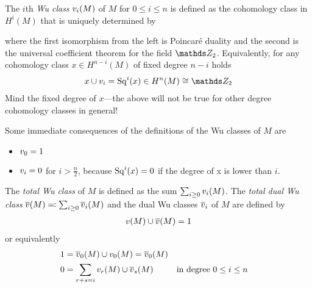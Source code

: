 \begin{Def}\label{def:wuclasses}
  The $i$th \emph{Wu class} $v_i(M)$ of $M$ for $0\leq i\leq n$ is defined
  as the cohomology class in $H^i(M)$ that is uniquely determined by
  \begin{center}
  \end{center}
  where the first isomorphism from the left is Poincaré duality %
  and the second is the universal coefficient theorem %
  for the field $\Zmod2$.
  Equivalently, for any cohomology class $x\in H^{n-i}(M)$ of fixed
  degree $n-i$ holds
  \begin{gather*}
    x\cup \v_i = \Sq i(x) \in H^n(M) \cong \Zmod2
  \end{gather*}
  Mind the fixed degree of $x$---the above will not be true for other
  degree cohomology classes in general!
\end{Def}

\begin{Rem}
  Some immediate consequences of the definitions of the Wu classes of
  $M$ are
  \begin{itemize}
  \item $v_0 = 1$
  \item $v_i = 0$ for $i>\frac n 2$, because $\mathrm{Sq}^{i}(x) = 0$ if the
    degree of x is lower than $i$.
  \end{itemize}
\end{Rem}


\begin{Def}
  The \emph{total Wu class} of $M$ is defined as the sum
  $\sum_{i\geq0}v_i(M)$. The \emph{total dual Wu class}
  $\overline{v}(M)\eqqcolon \sum_{i\geq 0}\overline{v}_i(M)$
  and the dual Wu classes $\overline{v}_i$
  of $M$ are defined by
  \begin{gather*}
    v(M) \cup \overline{v}(M) = 1
  \end{gather*}
  or equivalently
  \begin{align*}
    1 &= \overline{v}_0(M) \cup v_0(M) = \overline{v}_0(M) \\
    0 &= \sum_{r+s=i}v_r(M)\cup\overline{v}_s(M)
      &&\text{in degree $0\leq i\leq n$}
  \end{align*}
\end{Def}

